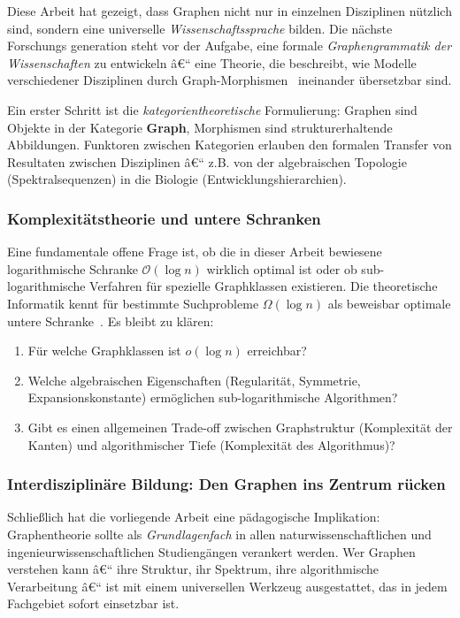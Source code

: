 ﻿\documentclass[12pt,a4paper,twoside]{article}
\theoremstyle{definition}
\theoremstyle{plain}
\theoremstyle{remark}
\begin{document}
Diese Arbeit hat gezeigt, dass Graphen nicht nur in
einzelnen Disziplinen nützlich sind, sondern eine universelle
\emph{Wissenschaftssprache} bilden.  Die nächste Forschungs\-
generation steht vor der Aufgabe, eine formale
\emph{Graphengrammatik der Wissenschaften} zu entwickeln â€“
eine Theorie, die beschreibt, wie Modelle verschiedener
Disziplinen durch Graph-Morphismen~\cite{Ehrig2006}
ineinander übersetzbar sind.

Ein erster Schritt ist die \emph{kategorientheoretische}
Formulierung: Graphen sind Objekte in der Kategorie
\textbf{Graph}, Morphismen sind strukturerhaltende
Abbildungen.  Funktoren zwischen Kategorien erlauben
den formalen Transfer von Resultaten zwischen Disziplinen â€“
z.B. von der algebraischen Topologie (Spektralsequenzen)
in die Biologie (Entwicklungshierarchien).

\subsubsection{Komplexitätstheorie und untere Schranken}

Eine fundamentale offene Frage ist, ob die in dieser Arbeit
bewiesene logarithmische Schranke $\mathcal{O}(\log n)$
wirklich optimal ist oder ob sub-logarithmische Verfahren
für spezielle Graphklassen existieren.  Die theoretische
Informatik kennt für bestimmte Suchprobleme
$\Omega(\log n)$ als beweisbar optimale untere Schranke~\cite{Hromkovic2004}.
Es bleibt zu klären:
\begin{enumerate}
  \item Für welche Graphklassen ist $o(\log n)$ erreichbar?
  \item Welche algebraischen Eigenschaften (Regularität,
        Symmetrie, Expansionskonstante) ermöglichen
        sub-logarithmische Algorithmen?
  \item Gibt es einen allgemeinen Trade-off zwischen
        Graphstruktur (Komplexität der Kanten) und
        algorithmischer Tiefe (Komplexität des Algorithmus)?
\end{enumerate}

\subsubsection{Interdisziplinäre Bildung: Den Graphen ins Zentrum rücken}

Schließlich hat die vorliegende Arbeit eine pädagogische
Implikation: Graphentheorie sollte als \emph{Grundlagenfach}
in allen naturwissenschaftlichen und ingenieurwissenschaftlichen
Studiengängen verankert werden.  Wer Graphen verstehen kann â€“
ihre Struktur, ihr Spektrum, ihre algorithmische Verarbeitung â€“
ist mit einem universellen Werkzeug ausgestattet, das in
jedem Fachgebiet sofort einsetzbar ist.
\end{document}
